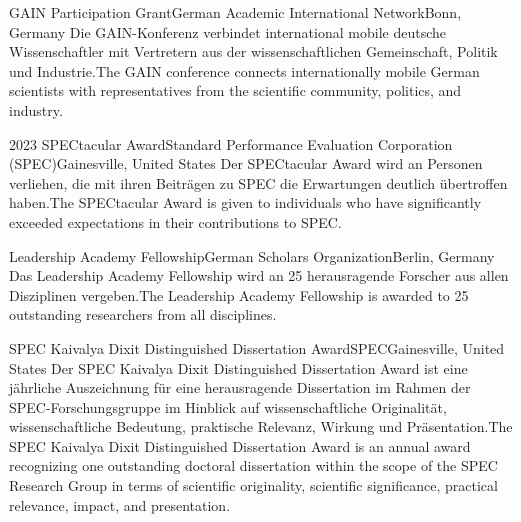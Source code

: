 
\begin{cventries}

    {GAIN Participation Grant}{German Academic International Network}{Bonn, Germany}%
    {}%
    {Die GAIN-Konferenz verbindet international mobile deutsche Wissenschaftler mit Vertretern aus der wissenschaftlichen Gemeinschaft, Politik und Industrie.}{The GAIN conference connects internationally mobile German scientists with representatives from the scientific community, politics, and industry.}

    {2023 SPECtacular Award}{Standard Performance Evaluation Corporation (SPEC)}{Gainesville, United States}%
    {}%
    {Der SPECtacular Award wird an Personen verliehen, die mit ihren Beiträgen zu SPEC die Erwartungen deutlich übertroffen haben.}{The SPECtacular Award is given to individuals who have significantly exceeded expectations in their contributions to SPEC.}

	{Leadership Academy Fellowship}{German Scholars Organization}{Berlin, Germany}%
    {}%
    {Das Leadership Academy Fellowship wird an 25 herausragende Forscher aus allen Disziplinen vergeben.}{The Leadership Academy Fellowship is awarded to 25 outstanding researchers from all disciplines.}

	{SPEC Kaivalya Dixit Distinguished Dissertation Award}{SPEC}{Gainesville, United States}%
    {}%
    {Der SPEC Kaivalya Dixit Distinguished Dissertation Award ist eine jährliche Auszeichnung für eine herausragende Dissertation im Rahmen der SPEC-Forschungsgruppe im Hinblick auf wissenschaftliche Originalität, wissenschaftliche Bedeutung, praktische Relevanz, Wirkung und Präsentation.}{The SPEC Kaivalya Dixit Distinguished Dissertation Award is an annual award recognizing one outstanding doctoral dissertation within the scope of the SPEC Research Group in terms of scientific originality, scientific significance, practical relevance, impact, and presentation.}


\end{cventries}
